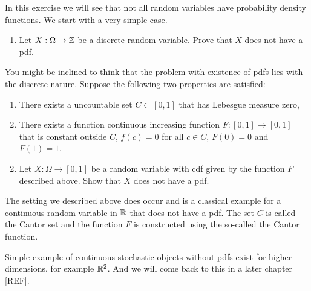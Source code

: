 \begin{problem}\label{prb:no_pdf}
In this exercise we will see that not all random variables have probability density functions. We start with a very simple case.
\begin{enumerate}[label=(\alph*)]
\item Let $X : \Omega \to \mathbb Z$ be a discrete random variable. Prove that $X$ does not have a pdf.
\end{enumerate}

You might be inclined to think that the problem with existence of pdfs lies with the discrete nature. Suppose the following two properties are satisfied:
\begin{enumerate}
\item There exists a uncountable set $C \subset [0,1]$ that has Lebesgue measure zero,
\item There exists a function continuous increasing function $F: [0,1] \to [0,1]$ that is constant outside $C$, $f(c) = 0$ for all $c \in C$, $F(0) = 0$ and $F(1) = 1$.
\end{enumerate}

\begin{enumerate}[label=(\alph*)]
\setcounter{enumi}{1}
\item Let $X : \Omega \to [0,1]$ be a random variable with cdf given by the function $F$ described above. Show that $X$ does not have a pdf.
\end{enumerate}

The setting we described above does occur and is a classical example for a continuous random variable in $\mathbb R$ that does not have a pdf. The set $C$ is called the Cantor set and the function $F$ is constructed using the so-called the Cantor function. 

Simple example of continuous stochastic objects without pdfs exist for higher dimensions, for example $\mathbb R^2$. And we will come back to this in a later chapter [REF].
\end{problem}

